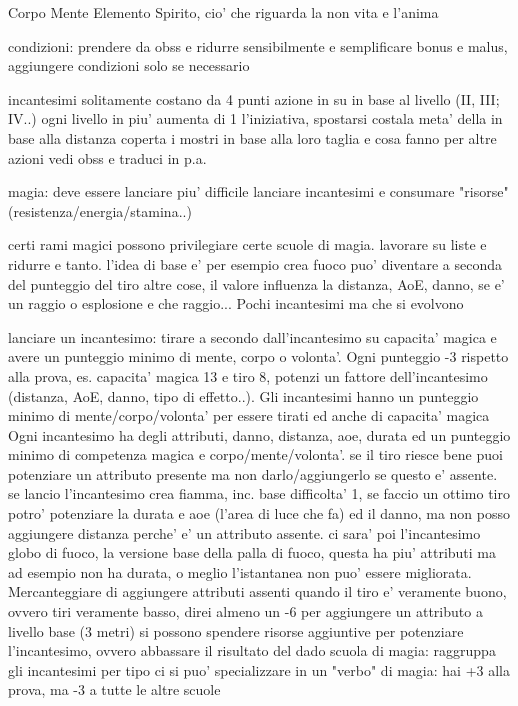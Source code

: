 \documentclass[12pt,a4paper,twoside,openany]{book}
\begin{document}
Corpo
Mente
Elemento
Spirito, cio' che riguarda la non vita e l'anima






condizioni: prendere da obss e ridurre sensibilmente  e semplificare bonus e malus, aggiungere condizioni solo se necessario

incantesimi solitamente costano da 4 punti azione in su in base  al livello (II, III; IV..) ogni livello in piu' aumenta di 1 l'iniziativa, spostarsi costala meta' della in base alla distanza coperta
i mostri in base alla loro taglia e cosa fanno
per altre azioni vedi obss e traduci in p.a.

magia: deve essere lanciare piu' difficile lanciare incantesimi e consumare "risorse" (resistenza/energia/stamina..)

certi rami magici possono privilegiare certe scuole di magia. lavorare su liste e ridurre e tanto. l'idea di base e' per esempio crea fuoco puo' diventare a seconda del punteggio del tiro altre cose, il valore influenza la distanza, AoE, danno, se e' un raggio o esplosione e che raggio...  Pochi incantesimi ma che si evolvono

lanciare un incantesimo: tirare a secondo dall'incantesimo su capacita' magica e avere un punteggio minimo di  mente, corpo o volonta'.  Ogni punteggio -3 rispetto alla prova, es. capacita' magica 13 e tiro 8, potenzi un fattore dell'incantesimo (distanza, AoE, danno, tipo di effetto..). Gli incantesimi hanno un punteggio minimo di mente/corpo/volonta' per essere tirati ed anche di capacita' magica
Ogni incantesimo ha degli attributi, danno, distanza, aoe, durata ed un punteggio minimo di competenza magica e corpo/mente/volonta'. se il tiro riesce bene puoi potenziare un attributo presente ma non darlo/aggiungerlo se questo e' assente. se lancio l'incantesimo crea fiamma, inc. base difficolta' 1, se faccio un ottimo tiro potro' potenziare la durata e aoe (l'area di luce che fa) ed il danno, ma non posso aggiungere distanza perche' e' un attributo assente.
ci sara' poi l'incantesimo globo di fuoco, la versione base della palla di fuoco, questa ha piu' attributi ma ad esempio non ha durata, o meglio l'istantanea non puo' essere migliorata.
Mercanteggiare di aggiungere attributi assenti quando il tiro e' veramente buono, ovvero tiri veramente basso, direi almeno un -6 per aggiungere un attributo a livello base (3 metri)
si possono spendere risorse aggiuntive per potenziare l'incantesimo, ovvero abbassare il risultato del dado
scuola di magia: raggruppa gli incantesimi per tipo
ci si puo' specializzare in un "verbo" di magia: hai +3 alla prova, ma -3 a tutte le altre scuole
\end{document}
